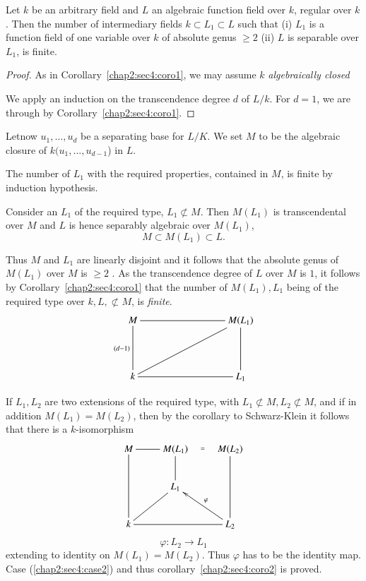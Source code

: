 \begin{corollary}\label{chap2:sec4:coro2}%
  Let $k$ be an arbitrary field and $L$ an algebraic function field
  over $k$, regular over $k$. Then the number of intermediary fields
  $k \subset L_1 \subset L$ such that (i) $L_1$ is a function field
  of one variable over $k$ of absolute genus $\ge 2$ (ii) $L$ is
  separable over $L_1$, is finite.  
\end{corollary}

\begin{proof}%
  As in Corollary~\ref{chap2:sec4:coro1}, we may assume $k$
  \textit{algebraically closed}  
  
  We apply an induction on the transcendence degree $d$ of $L/k$. For $d=1$, we
  are through by Corollary~\ref{chap2:sec4:coro1}. 
\end{proof}

Let\pageoriginale now $u_1,\ldots , u_d$ be a separating base for $L/K$. We set $M$
to be the algebraic closure of $k(u_1, \ldots , u_{d-1}$) in $L$. 

\setcounter{case}{0}
\begin{case}\label{chap2:sec4:case1}%
  The number of $L_1$ with the required properties, contained in $M$,
  is finite by induction hypothesis.  
\end{case}

\begin{case}\label{chap2:sec4:case2}%
  Consider an $L_1$ of the required type, $L_1 \not\subset M$. Then
  $M(L_1)$ is transcendental over $M$ and $L$ is hence separably
  algebraic over $M(L_1)$, 
  $$
  M \subset M(L_1) \subset L.
  $$
\end{case}

Thus $M$ and $L_1$ are linearly disjoint and it follows that the
absolute genus of $M(L_1)$ over $M$ is $\ge 2$ . As the transcendence
degree of $L$ over $M$ is $1$, it follows by 
Corollary~\ref{chap2:sec4:coro1} that the 
number of $M(L_1),L_1$ being of the required type over $k,L,
\not\subset M$, is \textit{finite}. 
\[
\xymatrix@R=1.5cm@C=3cm{M \ar@{-}[d]_{(d-1)}\ar@{-}[r] & M(L_1)
  \ar@{-}[d] \ar@{-}[dl]\\ 
  k \ar@{-}[r]& L_1
}
\]

If $L_1, L_2$ are two extensions of
the required type, with $L_1 \not\subset M, L_2 \not\subset M$, and if
in addition $M(L_1)=M(L_2)$, then by the corollary to Schwarz-Klein it
follows that there is a $k$-isomorphism 
\[
\xymatrix{M \ar@{-}[dd]\ar@{-}[r] & M(L_1) \ar@{-}[d] \ar@{}[r]|{=} &
  M(L_2)\ar@{-}[dd]\\ 
  & L_1 &\\
  k\ar@{-}[ru] \ar@{-}[rr] & &  L_2 \ar[lu]_\varphi
}
\]
$$
\varphi : L_2 \rightarrow L_1
$$
extending to identity on $M(L_1)=M(L_2)$. Thus $\varphi$ has to be the
identity map. Case (\ref{chap2:sec4:case2}) and thus 
corollary~\ref{chap2:sec4:coro2} is proved. 

